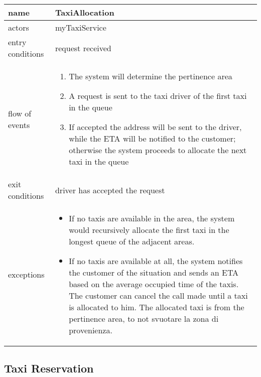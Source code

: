 	\begin{fullwidth}
		\begin{tabular}{ l p{} }
	\toprule
	name	&	TaxiAllocation
	\\ \midrule
	actors	&	myTaxiService
	\\ \midrule
	entry conditions & request received
	\\ \midrule
	flow of events & \begin{enumerate}
	
		\item The system will determine the pertinence area
		\item A request is sent to the taxi driver of the first taxi in the queue
		\item If accepted the address will be sent to the driver, while the ETA will be notified to the customer; otherwise the system proceeds to allocate the next taxi in the queue
	
	\end{enumerate}\\ \midrule
	exit conditions	&	 driver has accepted the request
	\\ \midrule
	exceptions & \begin{itemize}
		
		\item If no taxis are available in the area, the system would recursively allocate the first taxi in the longest queue of the adjacent areas.
		\item If no taxis are available at all, the system notifies the customer of the situation and sends an ETA based on the average occupied time of the taxis. The customer can cancel the call made until a taxi is allocated to him. The allocated taxi is from the pertinence area, to not svuotare la zona di provenienza.
	
	\end{itemize}\\ \bottomrule
\end{tabular}
	\end{fullwidth}


\subsection{Taxi Reservation}
